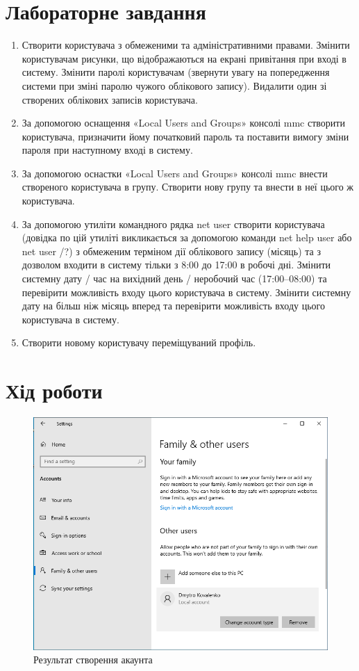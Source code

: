 \documentclass[oneside,14pt]{extarticle}
\begin{document}
\begin{normalsize}
    \section*{Лабораторне завдання}
	\begin{enumerate}
		\item Створити користувача з обмеженими та адміністративними правами.
		Змінити користувачам рисунки, що відображаються на екрані привітання при
		вході в систему. Змінити паролі користувачам (звернути увагу на попередження
		системи при зміні паролю чужого облікового запису). Видалити один зі
		створених облікових записів користувача.
		\item За допомогою оснащення «Local Users and Groups» консолі mmc
		створити користувача, призначити йому початковий пароль та поставити вимогу
		зміни пароля при наступному вході в систему.
		\item За допомогою оснастки «Local Users and Groups» консолі mmc
		внести створеного користувача в групу. Створити нову групу та внести в неї
		цього ж користувача.
		\item За допомогою утиліти командного рядка net user створити
		користувача (довідка по цій утиліті викликається за допомогою команди net help
		user або net user /?) з обмеженим терміном дії облікового запису (місяць) та з
		дозволом входити в систему тільки з 8:00 до 17:00 в робочі дні. Змінити системну
		дату / час на вихідний день / неробочий час (17:00–08:00) та перевірити
		можливість входу цього користувача в систему. Змінити системну дату на більш
		ніж місяць вперед та перевірити можливість входу цього користувача в систему.
		\item Створити новому користувачу переміщуваний профіль.
	\end{enumerate}

	\section*{Хід роботи}
	
	\begin{figure}[H]
		\centering
		\includegraphics[scale=0.6]{1}
		\caption{Результат створення акаунта}
	\end{figure}
	

\end{normalsize}
\end{document}
